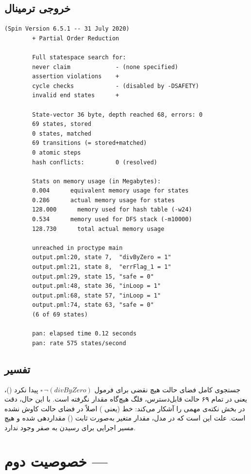 \documentclass[12pt,a4paper]{article}
\begin{document}
\subsection{خروجی ترمینال}
\begin{latin}
	\begin{lstlisting}[style=termstyle]
		(Spin Version 6.5.1 -- 31 July 2020)
		+ Partial Order Reduction
		
		Full statespace search for:
		never claim             - (none specified)
		assertion violations    +
		cycle checks            - (disabled by -DSAFETY)
		invalid end states      +
		
		State-vector 36 byte, depth reached 68, errors: 0
		69 states, stored
		0 states, matched
		69 transitions (= stored+matched)
		0 atomic steps
		hash conflicts:         0 (resolved)
		
		Stats on memory usage (in Megabytes):
		0.004      equivalent memory usage for states
		0.286      actual memory usage for states
		128.000      memory used for hash table (-w24)
		0.534      memory used for DFS stack (-m10000)
		128.730      total actual memory usage
		
		unreached in proctype main
		output.pml:20, state 7,  "divByZero = 1"
		output.pml:21, state 8,  "errFlag_1 = 1"
		output.pml:29, state 15, "safe = 0"
		output.pml:48, state 36, "inLoop = 1"
		output.pml:68, state 57, "inLoop = 1"
		output.pml:74, state 63, "safe = 0"
		(6 of 69 states)
		
		pan: elapsed time 0.12 seconds
		pan: rate 575 states/second
	\end{lstlisting}
\end{latin}

\subsection{تفسیر}	جستجوی کامل فضای حالت هیچ نقضی برای فرمول $\square\,\lnot(\mathit{divByZero})$ پیدا نکرد ()، یعنی در تمام ۶۹ حالت قابل‌دسترس، فلگ  هیچ‌گاه مقدار  نگرفته است.
		با این حال، دقت در بخش  نکته‌ی مهمی را آشکار می‌کند: خط  (یعنی ) اصلاً در فضای حالت کاوش نشده است. علت این است که در مدل، مقدار متغیر  به‌صورت ثابت () مقداردهی شده و هیچ مسیر اجرایی برای رسیدن  به صفر وجود ندارد. 
	
\section{خصوصیت دوم --- }
\end{document}
